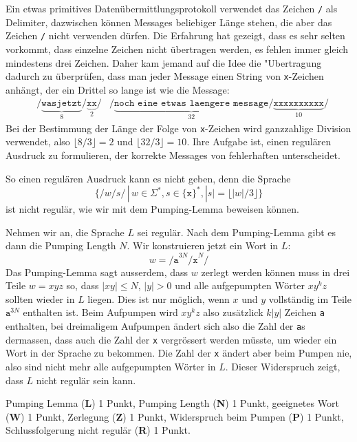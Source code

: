 Ein etwas primitives Datenübermittlungsprotokoll verwendet
das Zeichen \texttt{/} als Delimiter, dazwischen können Messages beliebiger
Länge stehen, die aber das Zeichen \texttt{/} nicht verwenden dürfen.
Die Erfahrung hat gezeigt, dass es sehr selten vorkommt, dass einzelne
Zeichen nicht übertragen werden, es fehlen immer gleich mindestens drei
Zeichen. Daher kam jemand auf die Idee die "Ubertragung dadurch zu überprüfen,
dass man jeder Message einen String von \texttt{x}-Zeichen anhängt, der
ein Drittel so lange ist wie die Message:
\begin{align*}
&\texttt{/}\underbrace{\texttt{wasjetzt}}_8\texttt{/}\underbrace{\texttt{xx}}_2\texttt{/}
&\texttt{/}\underbrace{\texttt{noch eine etwas laengere message}}_{32}\texttt{/}\underbrace{\texttt{xxxxxxxxxx}}_{10}\texttt{/}
\end{align*}
Bei der Bestimmung der Länge der Folge von \texttt{x}-Zeichen wird ganzzahlige
Division verwendet, also $\lfloor 8 / 3\rfloor = 2$ und $\lfloor 32 / 3 \rfloor = 10$.
Ihre Aufgabe ist, einen regulären Ausdruck zu formulieren, der korrekte
Messages von fehlerhaften unterscheidet.


\begin{loesung}
So einen regulären Ausdruck kann es nicht geben, denn die Sprache 
\[
\{ \texttt{/}w\texttt{/}s\texttt{/}\, |\, w\in \Sigma^*, s\in\{\texttt{x}\}^*,
|s| = \lfloor |w|/3\rfloor
\}
\]
ist nicht regulär, wie wir mit dem Pumping-Lemma beweisen können.

Nehmen wir an, die Sprache $L$ sei regulär. Nach dem Pumping-Lemma gibt
es dann die Pumping Length $N$. Wir konstruieren jetzt ein Wort in $L$:
\[
w=
\texttt{/a}^{3N}\texttt{/x}^N\texttt{/}
\]
Das Pumping-Lemma sagt ausserdem, dass $w$ zerlegt werden können muss in
drei Teile $w=xyz$ so, dass $|xy|\le N$, $|y|>0$ und alle aufgepumpten
Wörter $xy^kz$ sollten wieder in $L$ liegen. Dies ist nur möglich,
wenn $x$ und $y$ vollständig im Teile $\texttt{a}^{3N}$ enthalten ist.
Beim Aufpumpen wird $xy^kz$ also zusätzlick $k|y|$ Zeichen \texttt{a}
enthalten, bei dreimaligem Aufpumpen ändert sich also die Zahl der 
\texttt{a}s dermassen, dass auch die Zahl der \texttt{x} vergrössert
werden müsste, um wieder ein Wort in der Sprache zu bekommen. Die Zahl
der \texttt{x} ändert aber beim Pumpen nie, also sind nicht mehr alle
aufgepumpten Wörter in $L$. Dieser Widerspruch zeigt, dass $L$ nicht
regulär sein kann.
\end{loesung}

\begin{bewertung}
Pumping Lemma (\textbf{L}) 1 Punkt, Pumping Length (\textbf{N}) 1 Punkt,
geeignetes Wort (\textbf{W}) 1 Punkt, Zerlegung (\textbf{Z}) 1 Punkt,
Widerspruch beim Pumpen (\textbf{P}) 1 Punkt,
Schlussfolgerung nicht regulär (\textbf{R}) 1 Punkt.
\end{bewertung}
